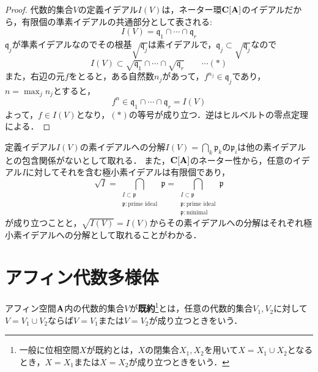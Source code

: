 \documentclass{myclass}
\begin{document}
\begin{proof}
  代数的集合$V$の定義イデアル$I(V)$は，ネーター環$\mathbf{C}[\mathbf{A}]$のイデアルだから，有限個の準素イデアルの共通部分として表される:
  \begin{equation*}
    I(V) = \mathfrak{q}_1\cap \cdots\cap \mathfrak{q}_r
  \end{equation*}
  $\mathfrak{q}_j$が準素イデアルなのでその根基$\sqrt{\mathfrak{q}_j}$は素イデアルで，$\mathfrak{q}_j\subset \sqrt{\mathfrak{q}_j}$なので
  \begin{equation*}
    I(V) \subset \sqrt{\mathfrak{q}_1}\cap \cdots \cap \sqrt{\mathfrak{q}_r}\qquad \cdots (*)
  \end{equation*}
  また，右辺の元$f$をとると，ある自然数$n_j$があって，$f^{n_j} \in \mathfrak{q}_j$であり，$n = \max_j n_j$とすると，
  \begin{equation*}
    f^n \in \mathfrak{q}_1\cap \cdots \cap \mathfrak{q}_r = I(V)
  \end{equation*}
  よって，$f\in I(V)$となり，$(*)$の等号が成り立つ．逆はヒルベルトの零点定理による．
\end{proof}

\begin{remark}
  定義イデアル$I(V)$の素イデアルへの分解$I(V) = \bigcap_k \mathfrak{p}_k$の$\mathfrak{p}_i$は他の素イデアルとの包含関係がないとして取れる． また，$\mathbf{C}[\mathbf{A}]$のネーター性から，任意のイデアル$I$に対してそれを含む極小素イデアルは有限個であり，
  \begin{equation*}
    \sqrt{I} = \bigcap_{\substack{I\subset \mathfrak{p} \\ \mathfrak{p}:\text{prime ideal}}} \mathfrak{p} = \bigcap_{\substack{I\subset \mathfrak{p} \\ \mathfrak{p}:\text{prime ideal} \\ \mathfrak{p}:\text{minimal}}} \mathfrak{p}
  \end{equation*}
  が成り立つことと，$\sqrt{I(V)} = I(V)$からその素イデアルへの分解はそれぞれ極小素イデアルへの分解として取れることがわかる．
\end{remark}


\section{アフィン代数多様体}

\begin{definition}
  アフィン空間$\mathbf{A}$内の代数的集合$V$が\textbf{既約}\footnote{一般に位相空間$X$が既約とは，$X$の閉集合$X_1,X_2$を用いて$X=X_1\cup X_2$となるとき，$X=X_1$または$X=X_2$が成り立つときをいう．}とは，任意の代数的集合$V_1,V_2$に対して$V = V_1\cup V_2$ならば$V=V_1$または$V=V_2$が成り立つときをいう．
\end{definition}
\end{document}
